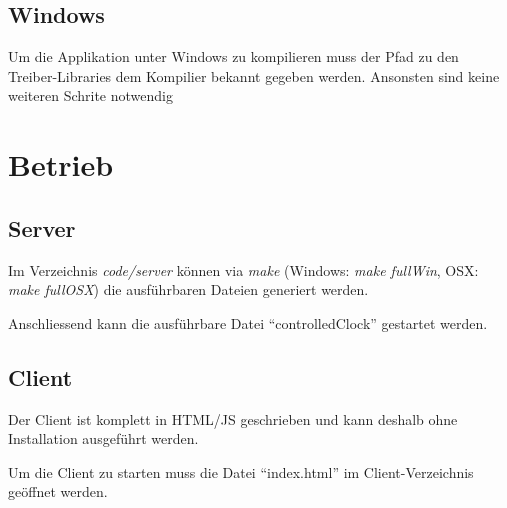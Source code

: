 \subsection{Windows}
Um die Applikation unter Windows zu kompilieren muss der Pfad zu den Treiber-Libraries dem Kompilier bekannt gegeben werden. Ansonsten sind keine weiteren Schrite notwendig

\section{Betrieb}
\subsection{Server}
Im Verzeichnis \textit{code/server} können via \textit{make} (Windows: \textit{make fullWin}, OSX: \textit{make fullOSX}) die ausführbaren Dateien generiert werden.

Anschliessend kann die ausführbare Datei "`controlledClock"' gestartet werden.

\subsection{Client}
Der Client ist komplett in HTML/JS geschrieben und kann deshalb ohne Installation ausgeführt werden. 

Um die Client zu starten muss die Datei "`index.html"' im Client-Verzeichnis geöffnet werden.

